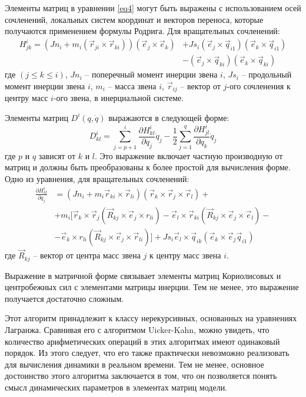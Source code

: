 Элементы матриц в уравнении \ref{eq4} могут быть выражены с использованием осей сочленений, локальных систем координат и векторов переноса, которые получаются применением формулы Родрига. Для вращательных сочленений:
\begin{align*}
H_{jk}^i = 
(Jn_i + m_i (\vec r_{ji} \times \vec r_{ki})) (\vec e_j \times \vec e_k)
&+ Js_i (\vec e_j \times \vec q_{i1}) (\vec e_k \times \vec q_{i1})
\\&- (\vec e_j  \times \vec q_{ki}) (\vec e_k \times \vec q_{ki})
\end{align*}
где $(j \le k \le i)$, $Jn_i$ -- поперечный момент инерции звена $i$, $Js_i$ -- продольный момент инерции звена $i$, $m_i$ -- масса звена $i$, $\vec r_{ij}$ -- вектор от $j$-ого сочленения к центру масс $i$-ого звена, в инерциальной системе.

Элементы матриц $D^i (q, \dot q)$ выражаются в следующей форме:
\begin{equation}
D_{kl}^i = 
\sum_{j=p+1}^{i}
\frac{\partial H_{kl}^i}{\partial q_j} \dot q_j - 
\frac{1}{2} \sum_{j=1}^{q}
\frac{\partial H_{jl}^i}{\partial q_k} \dot q_j
\end{equation}
где $p$ и $q$ зависят от $k$ и $l$. Это выражение включает частную производную от матриц и должны быть преобразованы к более простой для вычисления форме. Одно из уравнения, для вращательных сочленений:
\begin{align*}
\frac{\partial H_{kl}^i}{\partial q_j} &= 
(Jn_i + m_i \vec r_{ki} \times \vec r_{li})(\vec r_{k} \times \vec r_{j} \times \vec r_{l})+\\
& +m_i [\vec r_{k} \times \vec r_{j} (\vec R_{kj} \times \vec e_j \times r_{li})
- \vec e_l \times \vec r_{ki} (\vec R_{kj} \times \vec e_j \times \vec e_l) -\\
&- \vec e_k \times r_{li} (\vec R_{kj} \times \vec e_j \times \vec r_{li})] 
+ Js_i \vec e_l \times \vec q_{ik} (\vec e_k \times \vec e_j \vec q_{i1})
\end{align*}
где $\vec R_{kj}$ -- вектор от центра масс звена $j$ к центру масс звена $i$.

Выражение в матричной форме связывает элементы матриц Кориолисовых и центробежных сил с элементами матрицы инерции. Тем не менее, это выражение получается достаточно сложным. 

Этот алгоритм принадлежит к классу нерекурсивных, основанных на уравнениях Лагранжа. Сравнивая его с алгоритмом Uicker-Kahn, можно увидеть, что количество арифметических операций в этих алгоритмах имеют одинаковый порядок. Из этого следует, что его также практически невозможно реализовать для вычисления динамики в реальном времени. Тем не менее, основное достоинство этого алгоритма заключается в том, что он позволяется понять смысл динамических параметров в элементах матриц модели.

